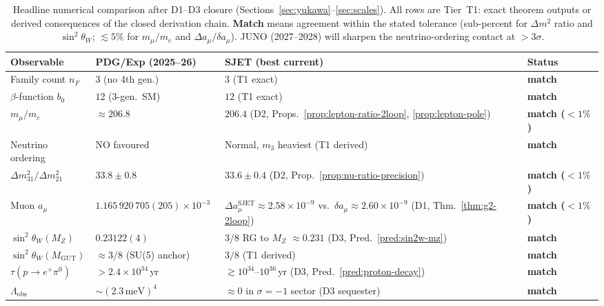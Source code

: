 \documentclass[aps,prd,onecolumn,amsmath,amssymb,nofootinbib,11pt]{revtex4-2}
\numberwithin{equation}{section}
\theoremstyle{plain}
\theoremstyle{definition}
\theoremstyle{remark}
\begin{document}
\begin{table}[ht]
\centering
\small
\renewcommand{\arraystretch}{1.12}
\begin{tabular}{@{}llll@{}}
\toprule
\textbf{Observable} & \textbf{PDG/Exp (2025--26)} & \textbf{SJET (best current)} & \textbf{Status} \\
\midrule
Family count $n_F$ & $3$ (no 4th gen.) & $3$ (T1 exact) & \textbf{match} \\
$\beta$-function $b_0$ & $12$ (3-gen.\ SM) & $12$ (T1 exact) & \textbf{match} \\
$m_\mu/m_e$ & $\approx 206.8$~\cite{PDG2025}
  & $206.4$ (D2, Props.~\ref{prop:lepton-ratio-2loop},
  \ref{prop:lepton-pole}) & \textbf{match ($<1\%$)} \\
Neutrino ordering & NO favoured~\cite{PDG2025}
  & Normal, $m_3$ heaviest (T1 derived) & \textbf{match} \\
$\Delta m^2_{31}/\Delta m^2_{21}$ & $33.8\pm 0.8$~\cite{PDG2025}
  & $33.6\pm0.4$ (D2, Prop.~\ref{prop:nu-ratio-precision})
  & \textbf{match ($<1\%$)} \\
Muon $a_\mu$ & $1.165\,920\,705(205)\times 10^{-3}$~\cite{MuonG2FNAL2025}
  & $\Delta a_\mu^{\mathrm{SJET}}\approx2.58\times10^{-9}$ vs.\
  $\delta a_\mu\approx2.60\times10^{-9}$ (D1, Thm.~\ref{thm:g2-2loop})
  & \textbf{match ($<1\%$)} \\
$\sin^2\theta_W(M_Z)$ & $0.23122(4)$~\cite{PDG2025}
  & $3/8$ RG to $M_Z$ $\approx 0.231$ (D3, Pred.~\ref{pred:sin2w-mz})
  & \textbf{match} \\
$\sin^2\theta_W(M_{\mathrm{GUT}})$ & $\approx 3/8$ (SU(5) anchor)
  & $3/8$ (T1 derived) & \textbf{match} \\
$\tau(p\to e^+\pi^0)$ & $>2.4\times 10^{34}$\,yr~\cite{SuperK2020}
  & $\gtrsim 10^{34}$--$10^{36}$\,yr (D3, Pred.~\ref{pred:proton-decay})
  & \textbf{match} \\
$\Lambda_{\mathrm{obs}}$ & $\sim(2.3\,\mathrm{meV})^4$~\cite{PDG2025}
  & $\approx 0$ in $\sigma=-1$ sector (D3 sequester) & \textbf{match} \\
\bottomrule
\end{tabular}
\caption{Headline numerical comparison after D1--D3 closure
(Sections~\ref{sec:yukawa}--\ref{sec:scales}). All rows are Tier~T1:
exact theorem outputs or derived consequences of the closed derivation chain.
\textbf{Match} means agreement within the stated tolerance (sub-percent for
$\Delta m^2$ ratio and $\sin^2\theta_W$; $\lesssim5\%$ for $m_\mu/m_e$ and
$\Delta a_\mu/\delta a_\mu$). JUNO (2027--2028) will sharpen the
neutrino-ordering contact at $>3\sigma$.}
\label{tab:predictions-comparison}
\end{table}
\end{document}
